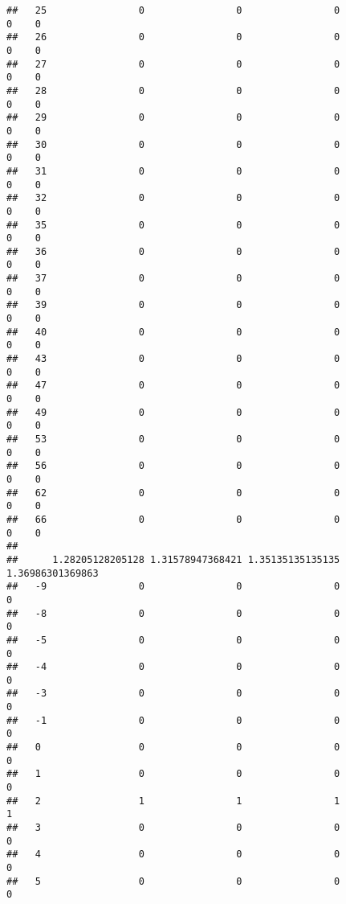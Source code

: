 \documentclass[]{article}
\begin{document}
\begin{verbatim}
##   25                0                0                0                0    0
##   26                0                0                0                0    0
##   27                0                0                0                0    0
##   28                0                0                0                0    0
##   29                0                0                0                0    0
##   30                0                0                0                0    0
##   31                0                0                0                0    0
##   32                0                0                0                0    0
##   35                0                0                0                0    0
##   36                0                0                0                0    0
##   37                0                0                0                0    0
##   39                0                0                0                0    0
##   40                0                0                0                0    0
##   43                0                0                0                0    0
##   47                0                0                0                0    0
##   49                0                0                0                0    0
##   53                0                0                0                0    0
##   56                0                0                0                0    0
##   62                0                0                0                0    0
##   66                0                0                0                0    0
##     
##      1.28205128205128 1.31578947368421 1.35135135135135 1.36986301369863
##   -9                0                0                0                0
##   -8                0                0                0                0
##   -5                0                0                0                0
##   -4                0                0                0                0
##   -3                0                0                0                0
##   -1                0                0                0                0
##   0                 0                0                0                0
##   1                 0                0                0                0
##   2                 1                1                1                1
##   3                 0                0                0                0
##   4                 0                0                0                0
##   5                 0                0                0                0

\end{verbatim}
\end{document}
